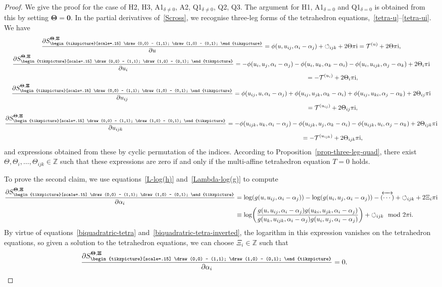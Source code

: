 \documentclass[pdftex]{sigma}
\newcommand{\reverse}{{\,\overleftrightarrow{\!(\cdots)\!}\,}}
\newcommand{\cross}{{\begin{tikzpicture}[scale=.15]
			\draw (0,0) -- (1,1);
			\draw (1,0) -- (0,1);
\end{tikzpicture}}}
\newcommand{\cyclic}{{\circlearrowleft}_{ijk}}
\newcommand{\pdv}[2]{\frac{\partial {#1}}{\partial {#2}}}
\newcommand{\Z}{\mathbb{Z}}
\renewcommand{\vec}{\boldsymbol}
\numberwithin{equation}{section}
\begin{document}
\begin{proof}\allowdisplaybreaks
 We give the proof for the case of H2, H3, A1$_{\delta\neq0}$, A2, Q1$_{\delta\neq0}$, Q2, Q3. The argument for H1, A1$_{\delta=0}$ and Q1$_{\delta=0}$ is obtained from this by setting $\vec \Theta = \vec 0$.
 In the partial derivatives of~\eqref{Scross}, we recognise three-leg forms of the tetrahedron equations,~\eqref{tetra-u}--\eqref{tetra-ui}. We have
 \begin{gather}
 \pdv{S^{\vec \Theta,\vec \Xi}_\cross}{u}
 = \phi(u,u_{ij},\alpha_i - \alpha_j) + \cyclic + 2 \Theta \pi {\rm i}
 = \mathcal{T}^{(u)} + 2 \Theta \pi {\rm i} , \label{cross-corners-u} \\
 \pdv{S^{\vec \Theta,\vec \Xi}_\cross}{u_i}
 = -\phi(u_i,u_j,\alpha_i - \alpha_j) - \phi(u_i,u_k,\alpha_k - \alpha_i) - \phi(u_i,u_{ijk},\alpha_j - \alpha_k) + 2 \Theta_i \pi {\rm i} \notag\\
 \hphantom{\pdv{S^{\vec \Theta,\vec \Xi}_\cross}{u_i}}{} = -\mathcal{T}^{(u_i)} + 2 \Theta_i \pi {\rm i} , \\
 \pdv{S^{\vec \Theta,\vec \Xi}_\cross}{u_{ij}}
 = \phi(u_{ij},u,\alpha_i-\alpha_j) + \phi(u_{ij},u_{jk},\alpha_k - \alpha_i) + \phi(u_{ij},u_{ki},\alpha_j-\alpha_k) + 2 \Theta_{ij} \pi {\rm i} \notag\\
 \hphantom{\pdv{S^{\vec \Theta,\vec \Xi}_\cross}{u_{ij}}}{} = \mathcal{T}^{(u_{ij})} + 2 \Theta_{ij} \pi {\rm i} , \\
 \pdv{S^{\vec \Theta,\vec \Xi}_\cross}{u_{ijk}}
 = -\phi(u_{ijk},u_k,\alpha_i-\alpha_j) - \phi(u_{ijk},u_j,\alpha_k - \alpha_i) - \phi(u_{ijk},u_{i},\alpha_j-\alpha_k) + 2 \Theta_{ijk} \pi {\rm i} \notag\\
 \hphantom{\pdv{S^{\vec \Theta,\vec \Xi}_\cross}{u_{ijk}}}{} = -\mathcal{T}^{(u_{ijk})} + 2 \Theta_{ijk} \pi {\rm i} , \label{cross-corners-uijk}
 \end{gather}
 and expressions obtained from these by cyclic permutation of the indices.
 According to Proposition~\ref{prop-three-leg-quad}, there exist $\Theta, \Theta_i, \dots, \Theta_{ijk} \in \Z$ such that these expressions are zero if and only if the multi-affine tetrahedron equation $T = 0$ holds.

 To prove the second claim, we use equations~\eqref{L-log(h)} and~\eqref{Lambda-log(g)} to compute
 \begin{align*}
 \pdv{S^{\vec \Theta,\vec \Xi}_\cross}{\alpha_i}
 &= \log(g(u,u_{ij},\alpha_i-\alpha_j)) - \log(g(u_i,u_j,\alpha_i-\alpha_j)) - \reverse + \cyclic + 2 \Xi_i \pi {\rm i} \\
 &\equiv \log \biggl( \frac{g(u,u_{ij},\alpha_i-\alpha_j) g(u_{ki},u_{jk},\alpha_i-\alpha_j)}{g(u_k,u_{ijk},\alpha_i-\alpha_j) g(u_i,u_j,\alpha_i-\alpha_j)} \biggr) + \cyclic \mod 2 \pi {\rm i} .
 \end{align*}
 By virtue of equations~\eqref{biquadratric-tetra} and~\eqref{biquadratric-tetra-inverted}, the logarithm in this expression vanishes on the tetrahedron equations, so given a solution to the tetrahedron equations, we can choose $\Xi_i \in \Z$ such that
 \[
 \pdv{S^{\vec \Theta,\vec \Xi}_\cross}{\alpha_i} = 0.\tag*{\qed}
 \]\renewcommand{\qed}{}
\end{proof}
\end{document}
